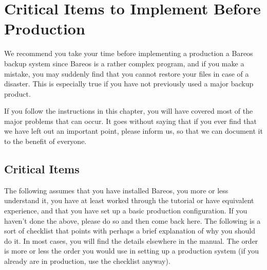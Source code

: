 
\chapter{Critical Items to Implement Before Production}
\label{CriticalChapter}

We recommend you take your time before implementing a production a Bareos
backup system since Bareos is a rather complex program, and if you make a
mistake, you may suddenly find that you cannot restore your files in case
of a disaster.  This is especially true if you have not previously used a
major backup product.

If you follow the instructions in this chapter, you will have covered most of
the major problems that can occur. It goes without saying that if you ever
find that we have left out an important point, please inform us, so
that we can document it to the benefit of everyone.

\label{Critical}
\section{Critical Items}

The following assumes that you have installed Bareos, you more or less
understand it, you have at least worked through the tutorial or have
equivalent experience, and that you have set up a basic production
configuration. If you haven't done the above, please do so and then come back
here. The following is a sort of checklist that points with perhaps a brief
explanation of why you should do it.  In most cases, you will find the
details elsewhere in the manual.  The order is more or less the order you
would use in setting up a production system (if you already are in
production, use the checklist anyway).

